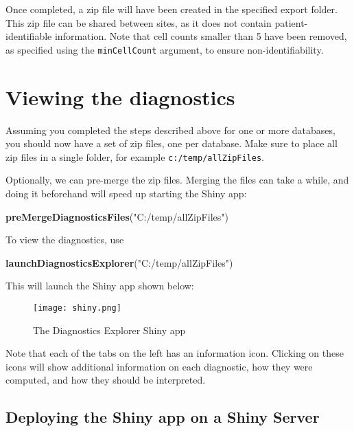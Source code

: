 \documentclass[
]{article}
\newenvironment{Shaded}{\begin{snugshade}}{\end{snugshade}}
\newcommand{\KeywordTok}[1]{\textcolor[rgb]{0.13,0.29,0.53}{\textbf{#1}}}
\newcommand{\NormalTok}[1]{#1}
\newcommand{\StringTok}[1]{\textcolor[rgb]{0.31,0.60,0.02}{#1}}
\begin{document}
Once completed, a zip file will have been created in the specified
export folder. This zip file can be shared between sites, as it does not
contain patient-identifiable information. Note that cell counts smaller
than 5 have been removed, as specified using the \texttt{minCellCount}
argument, to ensure non-identifiability.

\hypertarget{viewing-the-diagnostics}{%
\section{Viewing the diagnostics}\label{viewing-the-diagnostics}}

Assuming you completed the steps described above for one or more
databases, you should now have a set of zip files, one per database.
Make sure to place all zip files in a single folder, for example
\texttt{c:/temp/allZipFiles}.

Optionally, we can pre-merge the zip files. Merging the files can take a
while, and doing it beforehand will speed up starting the Shiny app:

\begin{Shaded}
\begin{Highlighting}[]
\KeywordTok{preMergeDiagnosticsFiles}\NormalTok{(}\StringTok{"C:/temp/allZipFiles"}\NormalTok{)}
\end{Highlighting}
\end{Shaded}

To view the diagnostics, use

\begin{Shaded}
\begin{Highlighting}[]
\KeywordTok{launchDiagnosticsExplorer}\NormalTok{(}\StringTok{"C:/temp/allZipFiles"}\NormalTok{)}
\end{Highlighting}
\end{Shaded}

This will launch the Shiny app shown below:

\begin{figure}
\centering
\texttt{[image: shiny.png]}
\caption{The Diagnostics Explorer Shiny app}
\end{figure}

Note that each of the tabs on the left has an information icon. Clicking
on these icons will show additional information on each diagnostic, how
they were computed, and how they should be interpreted.

\hypertarget{deploying-the-shiny-app-on-a-shiny-server}{%
\subsection{Deploying the Shiny app on a Shiny
Server}\label{deploying-the-shiny-app-on-a-shiny-server}}
\end{document}
